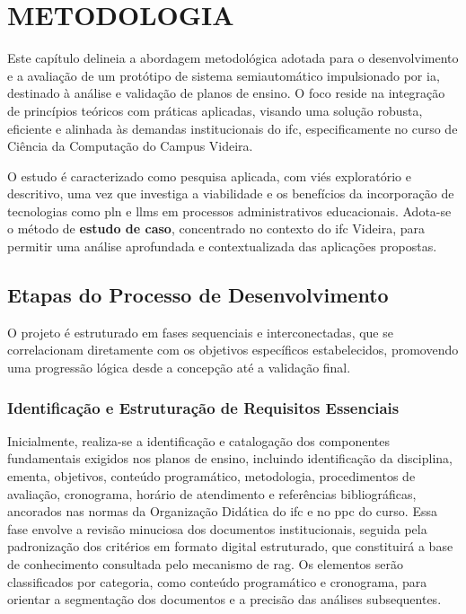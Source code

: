 \chapter{METODOLOGIA}
Este capítulo delineia a abordagem metodológica adotada para o desenvolvimento e a avaliação de um protótipo de sistema semiautomático impulsionado por \gls{ia}, destinado à análise e validação de planos de ensino. O foco reside na integração de princípios teóricos com práticas aplicadas, visando uma solução robusta, eficiente e alinhada às demandas institucionais do \gls{ifc}, especificamente no curso de Ciência da Computação do Campus Videira.

O estudo é caracterizado como pesquisa aplicada, com viés exploratório e descritivo, uma vez que investiga a viabilidade e os benefícios da incorporação de tecnologias como \gls{pln} e \glspl{llm} em processos administrativos educacionais. Adota-se o método de \textbf{estudo de caso}, concentrado no contexto do \gls{ifc} Videira, para permitir uma análise aprofundada e contextualizada das aplicações propostas.

\section{Etapas do Processo de Desenvolvimento}
O projeto é estruturado em fases sequenciais e interconectadas, que se correlacionam diretamente com os objetivos específicos estabelecidos, promovendo uma progressão lógica desde a concepção até a validação final.

\subsection{Identificação e Estruturação de Requisitos Essenciais}
Inicialmente, realiza-se a identificação e catalogação dos componentes fundamentais exigidos nos planos de ensino, incluindo identificação da disciplina, ementa, objetivos, conteúdo programático, metodologia, procedimentos de avaliação, cronograma, horário de atendimento e referências bibliográficas, ancorados nas normas da Organização Didática do \gls{ifc} \cite{ifc2022} e no \gls{ppc} do curso. Essa fase envolve a revisão minuciosa dos documentos institucionais, seguida pela padronização dos critérios em formato digital estruturado, que constituirá a base de conhecimento consultada pelo mecanismo de \gls{rag}. Os elementos serão classificados por categoria, como conteúdo programático e cronograma, para orientar a segmentação dos documentos e a precisão das análises subsequentes.

